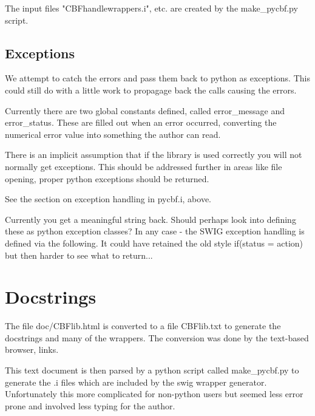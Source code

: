\documentclass[10pt,a4paper,twoside,notitlepage]{article}
\begin{document}
The input files "CBFhandlewrappers.i", etc. are created by the make\_pycbf.py
script.

\subsection{Exceptions}

We attempt to catch the errors and pass them back to python as 
exceptions. This could still do with a little work to propagage
back the calls causing the errors.

Currently there are two global  constants defined, called error\_message
and error\_status. 
These are filled out when an error occurred, converting the numerical
error value into something the author can read.

There is an implicit assumption that if the library is used 
correctly you will not normally get exceptions. 
This should be addressed further in areas like file opening,
proper python exceptions should be returned.

See the section on exception handling in pycbf.i, above.

Currently you get a meaningful string back. Should perhaps look into
defining these as python exception classes? 
In any case - the SWIG exception handling is defined via the following.
It could have retained the old style if(status = action) but then
harder to see what to return...


\section{Docstrings}

The file doc/CBFlib.html is converted to a file CBFlib.txt to generate the
docstrings and many of the wrappers.  The conversion was done by the
text-based browser, links.

This text document is then parsed by a python script called make\_pycbf.py 
to generate the .i files which are included by the swig wrapper generator.
Unfortunately this more complicated for non-python users but seemed less
error prone and involved less typing for the author.
\end{document}
